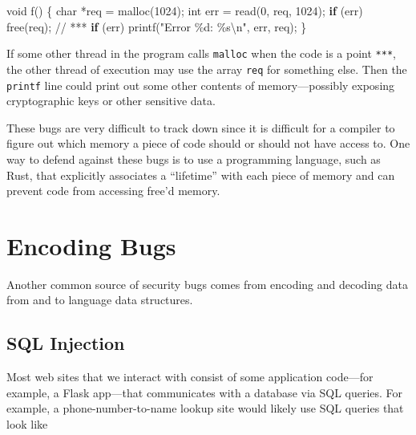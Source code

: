\documentclass[
  letterpaper,
]{scrbook}
\newenvironment{Shaded}{\begin{snugshade}}{\end{snugshade}}
\newcommand{\CommentTok}[1]{\textcolor[rgb]{0.37,0.37,0.37}{#1}}
\newcommand{\ControlFlowTok}[1]{\textcolor[rgb]{0.00,0.23,0.31}{\textbf{#1}}}
\newcommand{\DataTypeTok}[1]{\textcolor[rgb]{0.68,0.00,0.00}{#1}}
\newcommand{\DecValTok}[1]{\textcolor[rgb]{0.68,0.00,0.00}{#1}}
\newcommand{\NormalTok}[1]{\textcolor[rgb]{0.00,0.23,0.31}{#1}}
\newcommand{\OperatorTok}[1]{\textcolor[rgb]{0.37,0.37,0.37}{#1}}
\newcommand{\SpecialCharTok}[1]{\textcolor[rgb]{0.37,0.37,0.37}{#1}}
\newcommand{\StringTok}[1]{\textcolor[rgb]{0.13,0.47,0.30}{#1}}
\theoremstyle{definition}
\theoremstyle{plain}
\theoremstyle{plain}
\theoremstyle{remark}
\begin{document}
\begin{Shaded}
\begin{Highlighting}[]
\DataTypeTok{void}\NormalTok{ f}\OperatorTok{()} \OperatorTok{\{}
  \DataTypeTok{char} \OperatorTok{*}\NormalTok{req }\OperatorTok{=}\NormalTok{ malloc}\OperatorTok{(}\DecValTok{1024}\OperatorTok{);}
  \DataTypeTok{int}\NormalTok{ err }\OperatorTok{=}\NormalTok{ read}\OperatorTok{(}\DecValTok{0}\OperatorTok{,}\NormalTok{ req}\OperatorTok{,} \DecValTok{1024}\OperatorTok{);}
  \ControlFlowTok{if} \OperatorTok{(}\NormalTok{err}\OperatorTok{)}\NormalTok{ free}\OperatorTok{(}\NormalTok{req}\OperatorTok{);}
                            \CommentTok{// ***}
  \ControlFlowTok{if} \OperatorTok{(}\NormalTok{err}\OperatorTok{)}\NormalTok{ printf}\OperatorTok{(}\StringTok{"Error }\SpecialCharTok{\%d}\StringTok{: }\SpecialCharTok{\%s\textbackslash{}n}\StringTok{"}\OperatorTok{,}\NormalTok{ err}\OperatorTok{,}\NormalTok{ req}\OperatorTok{);}
\OperatorTok{\}}
\end{Highlighting}
\end{Shaded}

If some other thread in the program calls \texttt{malloc} when the code
is a point \texttt{***}, the other thread of execution may use the array
\texttt{req} for something else. Then the \texttt{printf} line could
print out some other contents of memory---possibly exposing
cryptographic keys or other sensitive data.

These bugs are very difficult to track down since it is difficult for a
compiler to figure out which memory a piece of code should or should not
have access to. One way to defend against these bugs is to use a
programming language, such as Rust, that explicitly associates a
``lifetime'' with each piece of memory and can prevent code from
accessing free'd memory.

\section{Encoding Bugs}\label{encoding-bugs}

Another common source of security bugs comes from encoding and decoding
data from and to language data structures.

\subsection{SQL Injection}\label{sql-injection}

Most web sites that we interact with consist of some application
code---for example, a Flask app---that communicates with a database via
SQL queries. For example, a phone-number-to-name lookup site would
likely use SQL queries that look like
\end{document}
